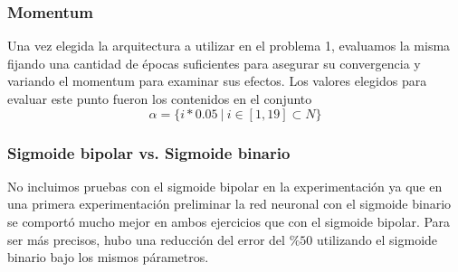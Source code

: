 \documentclass[informe.tex]{subfiles}
\begin{document}
    \subsubsection{Momentum}
      Una vez elegida la arquitectura a utilizar en el problema 1, evaluamos la misma fijando una cantidad de \'epocas suficientes para asegurar su convergencia y variando el momentum para examinar sus efectos. Los valores elegidos para evaluar este punto fueron los contenidos en el conjunto 
      $$\alpha = \{ i*0.05\ |\ i \in [1, 19] \subset N \}$$
      
    \subsubsection{Sigmoide bipolar vs. Sigmoide binario}
      No incluimos pruebas con el sigmoide bipolar en la experimentaci\'on ya que en una primera experimentaci\'on preliminar la red neuronal con el sigmoide binario se comport\'o mucho mejor en ambos ejercicios que con el sigmoide bipolar. Para ser m\'as precisos, hubo una reducci\'on del error del $\%50$ utilizando el sigmoide binario bajo los mismos p\'arametros.
  
\end{document}
